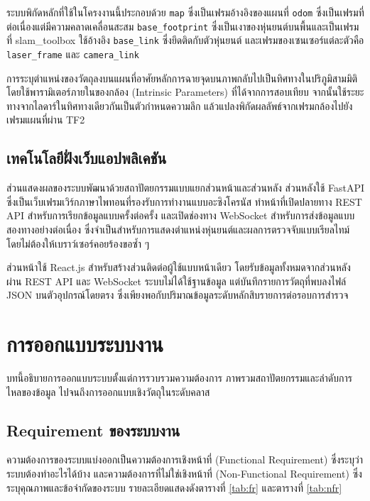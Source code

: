 \documentclass[a4paper,12pt]{report}
\begin{document}
ระบบพิกัดหลักที่ใช้ในโครงงานนี้ประกอบด้วย \texttt{map} ซึ่งเป็นเฟรมอ้างอิงของแผนที่
\texttt{odom} ซึ่งเป็นเฟรมที่ต่อเนื่องแต่มีความคลาดเคลื่อนสะสม
\texttt{base\_footprint} ซึ่งเป็นเงาของหุ่นยนต์บนพื้นและเป็นเฟรมที่ slam\_toolbox ใช้อ้างอิง
\texttt{base\_link} ซึ่งยึดติดกับตัวหุ่นยนต์
และเฟรมของเซนเซอร์แต่ละตัวคือ \texttt{laser\_frame} และ \texttt{camera\_link}

การระบุตำแหน่งของวัตถุลงบนแผนที่อาศัยหลักการฉายจุดบนภาพกลับไปเป็นทิศทางในปริภูมิสามมิติ
โดยใช้พารามิเตอร์ภายในของกล้อง (Intrinsic Parameters) ที่ได้จากการสอบเทียบ
จากนั้นใช้ระยะทางจากไลดาร์ในทิศทางเดียวกันเป็นตัวกำหนดความลึก
แล้วแปลงพิกัดผลลัพธ์จากเฟรมกล้องไปยังเฟรมแผนที่ผ่าน TF2

\section{เทคโนโลยีฝั่งเว็บแอปพลิเคชัน}

ส่วนแสดงผลของระบบพัฒนาด้วยสถาปัตยกรรมแบบแยกส่วนหน้าและส่วนหลัง
ส่วนหลังใช้ FastAPI ซึ่งเป็นเว็บเฟรมเวิร์กภาษาไพทอนที่รองรับการทำงานแบบอะซิงโครนัส
ทำหน้าที่เปิดปลายทาง REST API สำหรับการเรียกข้อมูลแบบครั้งต่อครั้ง
และเปิดช่องทาง WebSocket สำหรับการส่งข้อมูลแบบสองทางอย่างต่อเนื่อง
ซึ่งจำเป็นสำหรับการแสดงตำแหน่งหุ่นยนต์และผลการตรวจจับแบบเรียลไทม์
โดยไม่ต้องให้เบราว์เซอร์คอยร้องขอซ้ำ ๆ

ส่วนหน้าใช้ React.js สำหรับสร้างส่วนติดต่อผู้ใช้แบบหน้าเดียว
โดยรับข้อมูลทั้งหมดจากส่วนหลังผ่าน REST API และ WebSocket
ระบบไม่ได้ใช้ฐานข้อมูล แต่บันทึกรายการวัตถุที่พบลงไฟล์ JSON บนตัวอุปกรณ์โดยตรง
ซึ่งเพียงพอกับปริมาณข้อมูลระดับหลักสิบรายการต่อรอบการสำรวจ

\chapter{การออกแบบระบบงาน}

บทนี้อธิบายการออกแบบระบบตั้งแต่การรวบรวมความต้องการ
ภาพรวมสถาปัตยกรรมและลำดับการไหลของข้อมูล
ไปจนถึงการออกแบบเชิงวัตถุในระดับคลาส

\section{Requirement ของระบบงาน}

ความต้องการของระบบแบ่งออกเป็นความต้องการเชิงหน้าที่ (Functional Requirement)
ซึ่งระบุว่าระบบต้องทำอะไรได้บ้าง และความต้องการที่ไม่ใช่เชิงหน้าที่
(Non-Functional Requirement) ซึ่งระบุคุณภาพและข้อจำกัดของระบบ
รายละเอียดแสดงดังตารางที่ \ref{tab:fr} และตารางที่ \ref{tab:nfr}
\end{document}
